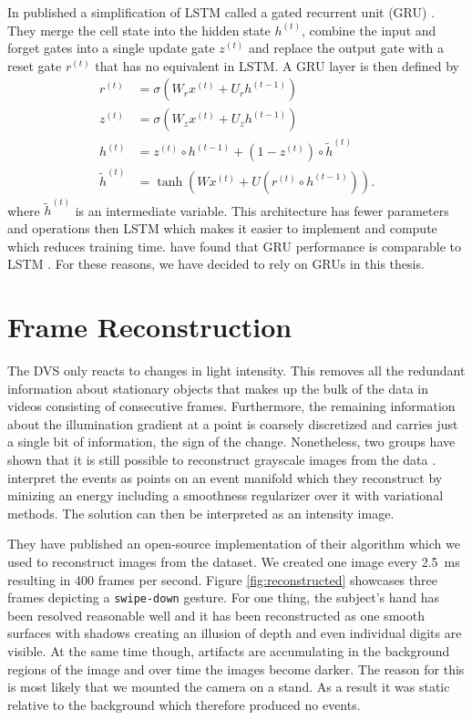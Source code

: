 In \citeyear{gru} \citeauthor{gru} published a simplification of LSTM called a
gated recurrent unit (GRU) \cite{gru}. They merge the cell state into the hidden
state $h^{(t)}$, combine the input and forget gates into a single update gate
$z^{(t)}$ and replace the output gate with a reset gate $r^{(t)}$ that has no
equivalent in LSTM. A GRU layer is then defined by
\begin{align*}
  r^{(t)} & = \sigma\left( W_{r}x^{(t)} + U_{r}h^{(t - 1)} \right)\\
  z^{(t)} & = \sigma\left( W_{z}x^{(t)} + U_{z}h^{(t - 1)} \right)\\
  h^{(t)} & = z^{(t)} \circ h^{(t - 1)} + \left( 1 - z^{(t)} \right) \circ \tilde{h}^{(t)}\\
  \tilde{h}^{(t)} & = \tanh\left( Wx^{(t)} + U\left( r^{(t)} \circ h^{(t - 1)} \right) \right).
\end{align*}
where $\tilde{h}^{(t)}$ is an intermediate variable. This architecture has fewer
parameters and operations then LSTM which makes it easier to implement and
compute which reduces training time. \citeauthor{gruvslstm} have found that GRU
performance is comparable to LSTM \cite{gruvslstm}. For these reasons, we have
decided to rely on GRUs in this thesis.

\section{Frame Reconstruction}
\label{sec:frame-reconstruction}

The DVS only reacts to changes in light intensity. This removes all the
redundant information about stationary objects that makes up the bulk of the
data in videos consisting of consecutive frames. Furthermore, the remaining
information about the illumination gradient at a point is coarsely discretized
and carries just a single bit of information, the sign of the change.
Nonetheless, two groups have shown that it is still possible to reconstruct
grayscale images from the data \cite{bardow2016,reinbacher2016}.
\citeauthor{reinbacher2016} interpret the events as points on an event manifold
which they reconstruct by minizing an energy including a smoothness regularizer
over it with variational methods. The solution can then be interpreted as an
intensity image.

They have published an open-source implementation of their algorithm which we
used to reconstruct images from the dataset. We created one image every
\SI{2.5}{\milli\second} resulting in 400 frames per second. Figure
\ref{fig:reconstructed} showcases three frames depicting a \texttt{swipe-down}
gesture. For one thing, the subject's hand has been resolved reasonable well and
it has been reconstructed as one smooth surfaces with shadows creating an
illusion of depth and even individual digits are visible. At the same time
though, artifacts are accumulating in the background regions of the image and
over time the images become darker. The reason for this is most likely that we
mounted the camera on a stand. As a result it was static relative to the
background which therefore produced no events.

